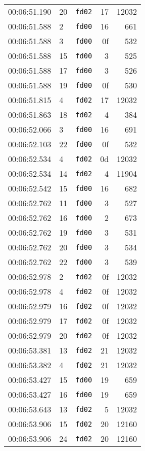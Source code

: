 \documentclass{article}
\begin{document}
\begin{longtable}{lllrr}
00:06:51.190 & 20 & \texttt{fd02} & 17 & 12032 \\
00:06:51.588 & 2 & \texttt{fd00} & 16 & 661 \\
00:06:51.588 & 3 & \texttt{fd00} & 0f & 532 \\
00:06:51.588 & 15 & \texttt{fd00} & 3 & 525 \\
00:06:51.588 & 17 & \texttt{fd00} & 3 & 526 \\
00:06:51.588 & 19 & \texttt{fd00} & 0f & 530 \\
00:06:51.815 & 4 & \texttt{fd02} & 17 & 12032 \\
00:06:51.863 & 18 & \texttt{fd02} & 4 & 384 \\
00:06:52.066 & 3 & \texttt{fd00} & 16 & 691 \\
00:06:52.103 & 22 & \texttt{fd00} & 0f & 532 \\
00:06:52.534 & 4 & \texttt{fd02} & 0d & 12032 \\
00:06:52.534 & 14 & \texttt{fd02} & 4 & 11904 \\
00:06:52.542 & 15 & \texttt{fd00} & 16 & 682 \\
00:06:52.762 & 11 & \texttt{fd00} & 3 & 527 \\
00:06:52.762 & 16 & \texttt{fd00} & 2 & 673 \\
00:06:52.762 & 19 & \texttt{fd00} & 3 & 531 \\
00:06:52.762 & 20 & \texttt{fd00} & 3 & 534 \\
00:06:52.762 & 22 & \texttt{fd00} & 3 & 539 \\
00:06:52.978 & 2 & \texttt{fd02} & 0f & 12032 \\
00:06:52.978 & 4 & \texttt{fd02} & 0f & 12032 \\
00:06:52.979 & 16 & \texttt{fd02} & 0f & 12032 \\
00:06:52.979 & 17 & \texttt{fd02} & 0f & 12032 \\
00:06:52.979 & 20 & \texttt{fd02} & 0f & 12032 \\
00:06:53.381 & 13 & \texttt{fd02} & 21 & 12032 \\
00:06:53.382 & 4 & \texttt{fd02} & 21 & 12032 \\
00:06:53.427 & 15 & \texttt{fd00} & 19 & 659 \\
00:06:53.427 & 16 & \texttt{fd00} & 19 & 659 \\
00:06:53.643 & 13 & \texttt{fd02} & 5 & 12032 \\
00:06:53.906 & 15 & \texttt{fd02} & 20 & 12160 \\
00:06:53.906 & 24 & \texttt{fd02} & 20 & 12160 \\

\end{longtable}
\end{document}
